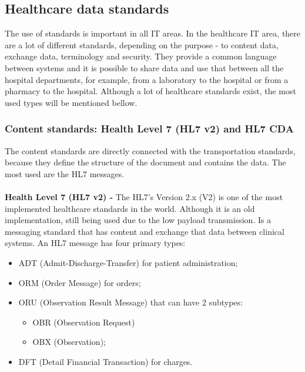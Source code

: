 \documentclass[mim_thesis.tex]{subfiles}
\begin{document}
\subsection{Healthcare data standards}
The use of standards is important in all IT areas. In the healthcare IT area, there are a lot of different standards, depending on the purpose - to content data, exchange data, terminology and security. They provide a common language between systems and it is possible to share data and use that between all the hospital departments, for example, from a laboratory to the hospital or from a pharmacy to the hospital. Although a lot of healthcare standards exist, the most used types will be mentioned bellow. 

\subsubsection{Content standards: Health Level 7 (HL7 v2) and HL7 CDA }
The content standards are directly connected with the transportation standards, because they define the structure of the document and contains the data. The most used are the HL7 messages.


\paragraph{}\textbf{Health Level 7 (HL7 v2) -}
The HL7’s Version 2.x (V2) is one of the most implemented healthcare standards in the world. Although it is an old implementation, still being used due to the low payload transmission. Is a messaging standard that has content and exchange that data between clinical systems. An HL7 message has four primary types: 

\begin{itemize}[noitemsep]
\item ADT (Admit-Discharge-Transfer) for patient administration;
\item ORM (Order Message) for orders;
\item ORU (Observation Result Message) that can have 2 subtypes: 
\begin{itemize}[noitemsep]
\item OBR (Observation Request)
\item OBX (Observation);
\end{itemize}
\item DFT (Detail Financial Transaction) for charges.
\end{itemize}
\end{document}
